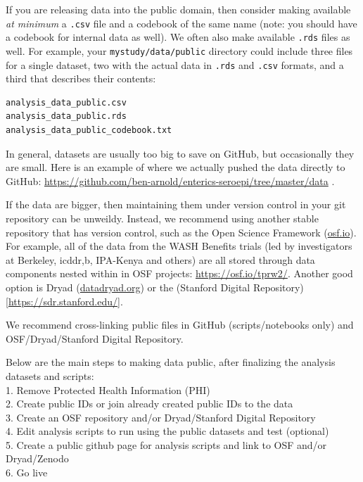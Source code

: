 \documentclass[
]{book}
\begin{document}
If you are releasing data into the public domain, then consider making available \emph{at minimum} a \texttt{.csv} file and a codebook of the same name (note: you should have a codebook for internal data as well). We often also make available \texttt{.rds} files as well. For example, your \texttt{mystudy/data/public} directory could include three files for a single dataset, two with the actual data in \texttt{.rds} and \texttt{.csv} formats, and a third that describes their contents:

\begin{verbatim}
analysis_data_public.csv
analysis_data_public.rds
analysis_data_public_codebook.txt
\end{verbatim}

In general, datasets are usually too big to save on GitHub, but occasionally they are small. Here is an example of where we actually pushed the data directly to GitHub: \url{https://github.com/ben-arnold/enterics-seroepi/tree/master/data} .

If the data are bigger, then maintaining them under version control in your git repository can be unweildy. Instead, we recommend using another stable repository that has version control, such as the Open Science Framework (\href{https://osf.io}{osf.io}). For example, all of the data from the WASH Benefits trials (led by investigators at Berkeley, icddr,b, IPA-Kenya and others) are all stored through data components nested within in OSF projects: \url{https://osf.io/tprw2/}. Another good option is Dryad (\href{https://datadryad.org/}{datadryad.org}) or the (Stanford Digital Repository){[}\url{https://sdr.stanford.edu/}{]}.

We recommend cross-linking public files in GitHub (scripts/notebooks only) and OSF/Dryad/Stanford Digital Repository.

Below are the main steps to making data public, after finalizing the analysis datasets and scripts:\\
1. Remove Protected Health Information (PHI)\\
2. Create public IDs or join already created public IDs to the data\\
3. Create an OSF repository and/or Dryad/Stanford Digital Repository\\
4. Edit analysis scripts to run using the public datasets and test (optional)\\
5. Create a public github page for analysis scripts and link to OSF and/or Dryad/Zenodo\\
6. Go live
\end{document}
